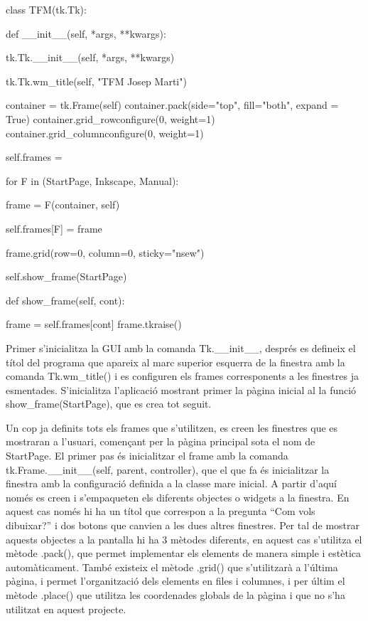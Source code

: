 \begin{python}
	class TFM(tk.Tk):
	
		def __init__(self, *args, **kwargs):
		
			tk.Tk.__init__(self, *args, **kwargs)
			
			tk.Tk.wm_title(self, "TFM Josep Marti")
			
			
			container = tk.Frame(self)
			container.pack(side="top", fill="both", expand = True)
			container.grid_rowconfigure(0, weight=1)
			container.grid_columnconfigure(0, weight=1)
			
			self.frames = {}
			
			for F in (StartPage, Inkscape, Manual):
			
			frame = F(container, self)
			
			self.frames[F] = frame
			
			frame.grid(row=0, column=0, sticky="nsew")
			
			self.show_frame(StartPage)
		
		def show_frame(self, cont):
		
			frame = self.frames[cont]
			frame.tkraise()
\end{python}

Primer s’inicialitza la GUI amb la comanda Tk.\_\_init\_\_, després es defineix el títol del programa que apareix al marc superior esquerra de la finestra amb la comanda Tk.wm\_title() i es configuren els frames corresponents a les finestres ja esmentades. S’inicialitza l’aplicació mostrant primer la pàgina inicial al la funció show\_frame(StartPage), que es crea tot seguit. 

Un cop ja definits tots els frames que s’utilitzen, es creen les finestres que es mostraran a l’usuari, començant per la pàgina principal sota el nom de StartPage. El primer pas és inicialitzar el frame amb la comanda tk.Frame.\_\_init\_\_(self, parent, controller), que el que fa és inicialitzar la finestra amb la configuració definida a la classe mare inicial. A partir d’aquí només es creen i s’empaqueten els diferents objectes o widgets a la finestra. En aquest cas només hi ha un títol que correspon a la pregunta “Com vols dibuixar?” i dos botons que canvien a les dues altres finestres. Per tal de mostrar aquests objectes a la pantalla hi ha 3 mètodes diferents, en aquest cas s’utilitza el mètode .pack(), que permet implementar els elements de manera simple i estètica automàticament. També existeix el mètode .grid() que s’utilitzarà a l’última pàgina, i permet l’organització dels elements en files i columnes, i per últim el mètode .place() que utilitza les coordenades globals de la pàgina i que no s’ha utilitzat en aquest projecte. 

